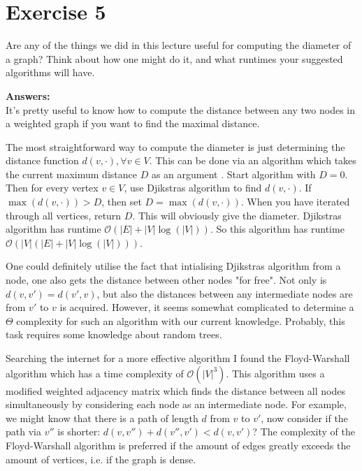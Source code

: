 \documentclass[nobib]{tufte-handout}
\begin{document}
\section{Exercise 5}

Are any of the things we did in this lecture useful for computing the diameter of a graph? Think about how one might do it, and what runtimes your suggested algorithms will have.

\textbf{Answers:}\\

It's pretty useful to know how to compute the distance between any two nodes in a weighted graph if you want to find the maximal distance. 

The most straightforward way to compute the diameter is just determining the distance function  \( d(v, \cdot), \forall v \in V \). This can be done via an algorithm which takes the current maximum distance  \( D \) as an argument . Start algorithm with \( D=0 \). Then for every vertex \( v\in V \), use Djikstras algorithm to find \( d(v,\cdot) \). If \( \max(d(v,\cdot))>D\), then set \(  D=\max(d(v,\cdot)) \). When you have iterated through all vertices, return \( D\). This will obviously give the diameter. Djikstras algorithm has runtime \( \mathcal{O}(|E|+|V| \log(|V|)) \). So this algorithm has runtime \( \mathcal{O}(|V|(|E|+|V| \log(|V|))) \). 

One could definitely utilise the fact that intialising Djikstras algorithm from a node, one also gets the distance between other nodes "for free". Not only is \( d(v,v')=d(v',v) \), but also the distances between any intermediate nodes are from \( v' \) to \( v \) is acquired. However, it seems somewhat complicated to determine a \( \Theta \) complexity for such an algorithm with our current knowledge. Probably, this task requires some knowledge about random trees. 

Searching the internet for a more effective algorithm I found the Floyd-Warshall algorithm which has a time complexity of \( \mathcal{O}(|V|^3) \). This algorithm uses a modified weighted adjacency matrix which finds the distance between all nodes simultaneously by considering each node as an intermediate node. For example, we might know that there is a path of length \( d\) from \( v \) to \( v' \), now consider if the path via \( v''\) is shorter: \( d(v,v'')+d(v'',v')<d(v,v') \)? The complexity of the Floyd-Warshall algorithm is preferred if the amount of edges greatly exceeds the amount of vertices, i.e. if the graph is dense. 
\end{document}
